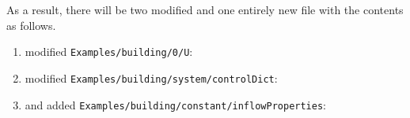 \noindent
As a result, there will be two modified and one entirely new file with the contents as follows.
\begin{enumerate}
\item
	modified \texttt{Examples/building/0/U}:
	

\item
	modified \texttt{Examples/building/system/controlDict}:
	

\item 
	and added \texttt{Examples/building/constant/inflowProperties}:
	
	
\end{enumerate}
